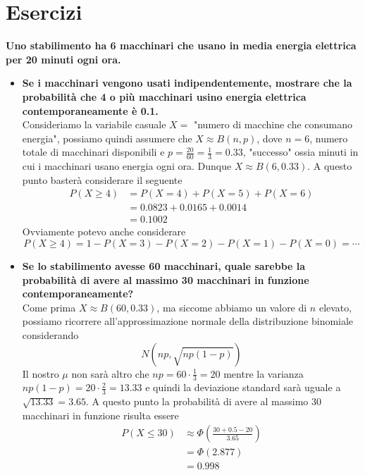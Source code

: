 \documentclass[11pt]{report}
\begin{document}
\section{Esercizi}
\textbf{Uno stabilimento ha 6 macchinari che usano in media energia elettrica
per 20 minuti ogni ora.}
\begin{itemize}
	\item \textbf{Se i macchinari vengono usati indipendentemente, mostrare che la probabilità che 4 o più macchinari usino energia elettrica
contemporaneamente è 0.1.}\\
	Consideriamo la variabile casuale $X =$ "numero di macchine che consumano energia", possiamo quindi assumere che $X \approx B(n,p)$, dove $n = 6$, numero totale di macchinari disponibili e $p = \frac{20}{60} = \frac{1}{3} = 0.33$, "successo" ossia minuti in cui i macchinari usano energia ogni ora. Dunque $X \approx B(6, 0.33)$. A questo punto basterà considerare il seguente
	\begin{equation}
    	\begin{split}
       		P(X \geq 4) & = P(X=4) + P(X=5) + P(X=6)\\
       		& = 0.0823 + 0.0165 + 0.0014\\
       		& = 0.1002
    	\end{split}
	\end{equation}
	Ovviamente potevo anche considerare
	$$P(X \geq 4) = 1 - P(X=3) - P(X=2) - P(X=1) - P(X=0) = \cdots$$
	\item \textbf{Se lo stabilimento avesse 60 macchinari, quale sarebbe la probabilità di avere al massimo 30 macchinari in funzione contemporaneamente?}\\
	Come prima $X \approx B(60, 0.33)$, ma siccome abbiamo un valore di $n$ elevato, possiamo ricorrere all'approssimazione normale della distribuzione binomiale considerando
	$$N \left( np, \sqrt{np(1-p)} \right)$$
	Il nostro $\mu$ non sarà altro che $np = 60 \cdot \frac{1}{3} = 20$ mentre la varianza $np(1-p) = 20 \cdot \frac{2}{3} = 13.33$ e quindi la deviazione standard sarà uguale a $\sqrt{13.33} = 3.65$. A questo punto la probabilità di avere al massimo 30 macchinari in funzione risulta essere
	\begin{equation}
    	\begin{split}
       		P(X \leq 30) & \approx \Phi \left( \frac{30 + 0.5 - 20}{3.65} \right)\\
       		& = \Phi(2.877)\\
       		& = 0.998
    	\end{split}

\end{equation}
\end{itemize}
\end{document}
